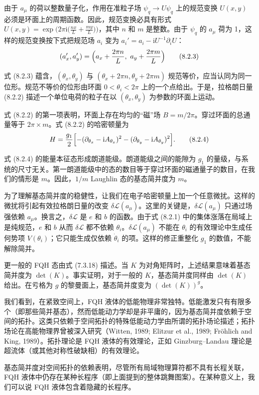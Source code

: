由于 $a_\mu$ 的荷以整数量子化，作用在准粒子场 $\psi_q \to U\psi_q$ 上的规范变换 $U(x,y)$ 必须是环面上的周期函数。因此，规范变换必具有形式 $U(x,y) = \exp\bigl(2\pi\mathrm{i}\bigl(\frac{nx}{L} + \frac{my}{L}\bigr)\bigr)$，其中 $n$ 和 $m$ 是整数。由于 $\psi_q$ 的 $a_\mu$ 荷为 1，这样的规范变换按下式把规范场 $a_i$ 变为 $a_i' = a_i - \mathrm{i}U^{-1}\partial_i U$：
\begin{equation*}
(a_x', a_y') = \Bigl(a_x + \frac{2\pi n}{L},\ a_y + \frac{2\pi m}{L}\Bigr) \tag{8.2.3}
\end{equation*}

式 (8.2.3) 蕴含，$(\theta_x, \theta_y)$ 与 $(\theta_x + 2\pi n, \theta_y + 2\pi m)$ 规范等价，应当认同为同一位形。规范不等价的位形由环面 $0 < \theta_i < 2\pi$ 上的一个点给出。于是，拉格朗日量 (8.2.2) 描述一个单位电荷的粒子在以 $(\theta_x, \theta_y)$ 为参数的环面上运动。

式 (8.2.2) 的第一项表明，环面上存在均匀的“磁”场 $B = m/2\pi$。穿过环面的总通量等于 $2\pi \times m$。式 (8.2.2) 的哈密顿量为
\begin{equation*}
H = \frac{g_1}{2} \Bigl[- (\partial_{\theta_x} - \mathrm{i} A_{\theta_x})^2 - (\partial_{\theta_y} - \mathrm{i} A_{\theta_y})^2 \Bigr]. \tag{8.2.4}
\end{equation*}

式 (8.2.4) 的能量本征态形成朗道能级。朗道能级之间的能隙为 $g_1$ 的量级，与系统的尺寸无关。第一朗道能级中的态的数目等于穿过环面的磁通量子的数目，在我们的情形是 $m$。因此，$1/m$ Laughlin 态的基态简并度为 $m$。

为了理解基态简并度的稳健性，让我们在电子哈密顿量上加一个任意微扰。这样的微扰将引起有效拉格朗日量的改变 $\delta\mathcal{L}(a_\mu)$。这里的关键是，$\delta\mathcal{L}(a_\mu)$ 只通过场强依赖 $a_\mu$。换言之，$\delta\mathcal{L}$ 是 $e$ 和 $b$ 的函数。由于式 (8.2.1) 中的集体涨落在局域上是纯规范，$e$ 和 $b$ 从而 $\delta\mathcal{L}$ 都不依赖 $\theta_i$。$\delta\mathcal{L}(a_\mu)$ 不能在 $\theta_i$ 的有效理论中生成任何势项 $V(\theta_i)$；它只能生成仅依赖 $\dot{\theta}_i$ 的项。这样的修正重整化 $g_1$ 的数值，不能解除简并。

更一般的 FQH 态由式 (7.3.18) 描述。当 $K$ 为对角矩阵时，上述结果意味着基态简并度为 $\det(K)$。事实证明，对于一般的 $K$，基态简并度同样由 $\det(K)$ 给出。在亏格为 $g$ 的黎曼面上，基态简并度变为 $(\det(K))^g$。

我们看到，在紧致空间上，FQH 液体的低能物理非常独特。低能激发只有有限多个（即那些简并基态），然而低能动力学却是非平庸的，因为基态简并度依赖于空间的拓扑。这类只依赖于空间拓扑的特殊低能动力学由所谓的拓扑场论描述；拓扑场论在高能物理界曾被深入研究（Witten, 1989; Elitzur et al., 1989; Fr\"{o}hlich and King, 1989）。拓扑理论是 FQH 液体的有效理论，正如 Ginzburg--Landau 理论是超流体（或其他对称性破缺相）的有效理论。

基态简并度对空间拓扑的依赖表明，尽管所有局域物理算符都不具有长程关联，FQH 液体中仍存在某种长程序（即上面提到的整体跳舞图案）。在某种意义上，我们可以说 FQH 液体包含着隐藏的长程序。
